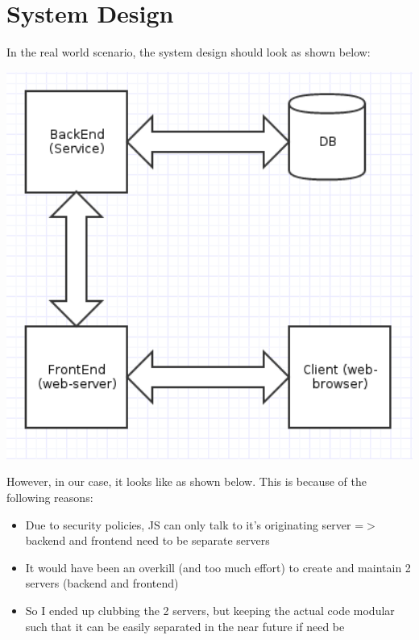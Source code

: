 \documentclass[a4paper, 10pt]{article}
\begin{document}
\section{System Design}
In the real world scenario, the system design should look as shown below:

\includegraphics[width=6in]{ideal.png}

However, in our case, it looks like as shown below. This is because of the following reasons:

\begin{itemize}
  \item Due to security policies, JS can only talk to it's originating server =$>$ backend and frontend need to be separate servers
  \item It would have been an overkill (and too much effort) to create and maintain 2 servers (backend and frontend)
  \item So I ended up clubbing the 2 servers, but keeping the actual code modular such that it can be easily separated in the near future if need be
\end{itemize}
\end{document}
